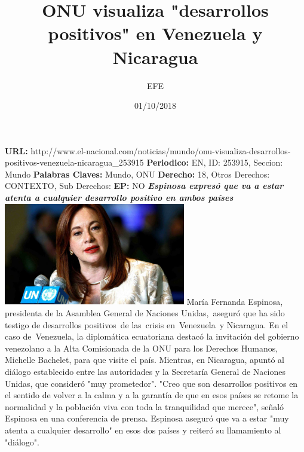 \documentclass{article}%
\title{\textbf{ONU visualiza "desarrollos positivos" en Venezuela y Nicaragua}}%
\author{EFE}%
\date{01/10/2018}%
\begin{document}
%
\normalsize%
\maketitle%
\textbf{URL: }%
http://www.el{-}nacional.com/noticias/mundo/onu{-}visualiza{-}desarrollos{-}positivos{-}venezuela{-}nicaragua\_253915\newline%
%
\textbf{Periodico: }%
EN, %
ID: %
253915, %
Seccion: %
Mundo\newline%
%
\textbf{Palabras Claves: }%
Mundo, ONU\newline%
%
\textbf{Derecho: }%
18, %
Otros Derechos: %
CONTEXTO, %
Sub Derechos: %
\newline%
%
\textbf{EP: }%
NO\newline%
\newline%
%
\textbf{\textit{Espinosa expresó que va a estar atenta a cualquier desarrollo positivo en ambos países}}%
\newline%
\newline%
%
\includegraphics[width=300px]{202.jpg}%
\newline%
%
María Fernanda Espinosa, presidenta de la Asamblea General de Naciones Unidas,~aseguró que ha sido testigo de desarrollos positivos~de las~crisis en~Venezuela~y Nicaragua.%
\newline%
%
En el caso de~Venezuela, la diplomática ecuatoriana destacó la invitación del gobierno venezolano a la Alta Comisionada de la ONU para los Derechos Humanos, Michelle Bachelet, para que visite el país.%
\newline%
%
Mientras, en Nicaragua, apuntó al diálogo establecido entre las autoridades y la Secretaría General de Naciones Unidas, que consideró "muy prometedor".%
\newline%
%
"Creo que son desarrollos positivos en el sentido de volver a la calma y a la garantía de que en esos países se retome la normalidad y la población viva con toda la tranquilidad que merece", señaló Espinosa en una conferencia de prensa.%
\newline%
%
Espinosa aseguró que va a estar "muy atenta a cualquier desarrollo" en esos dos países y reiteró su llamamiento al "diálogo".%
\newline%
%
\end{document}

